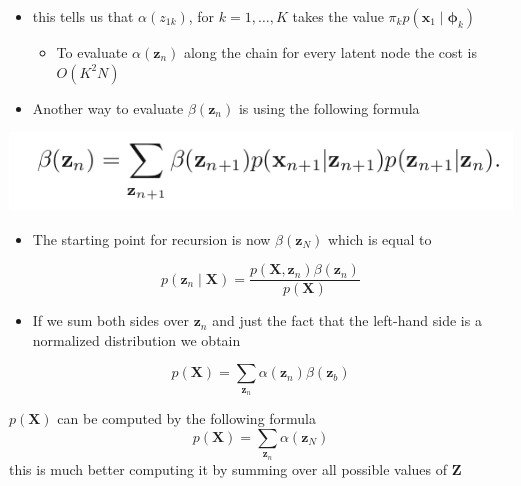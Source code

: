 \documentclass[11pt]{article}
\begin{document}
\begin{itemize}
\item this tells us that \(\alpha (z_{1k})\), for \(k=1,\dots, K\) takes the value \(\pi_kp(\pmb x_1 \mid \pmb \phi_k)\)
\begin{itemize}
\item To evaluate \(\alpha(\pmb z_n)\) along the chain for every latent node the cost is \(O(K^2N)\)
\end{itemize}

\item Another way to evaluate \(\beta(\pmb z_n)\) is using the following formula
\end{itemize}
\begin{center}
\includegraphics[width=.9\linewidth]{Sequential Data/screenshot_2018-10-30_19-20-42.png}
\end{center}
\begin{itemize}
\item The starting point for recursion is now \(\beta(\pmb z_N)\) which is equal to
\end{itemize}
\begin{equation}
  p(\pmb z_n \mid \pmb X) = \frac{p(\pmb X, \pmb z_n)\beta(\pmb z_n)}{p(\pmb X)}
\end{equation}

\begin{itemize}
\item If we sum both sides over \(\pmb z_n\) and just the fact that the left-hand side is a normalized distribution we obtain
\end{itemize}
\begin{equation}
  p(\pmb X) = \sum_{\pmb z_n} \alpha ( \pmb z_n) \beta (\pmb z_b)
\end{equation}

\(p(\pmb X)\) can be computed by the following formula
\begin{equation}
  p(\pmb X) = \sum_{\pmb z_n} \alpha (\pmb z_N)
\end{equation}
this is much better computing it by summing over all possible values of \(\pmb Z\) 
\end{document}
